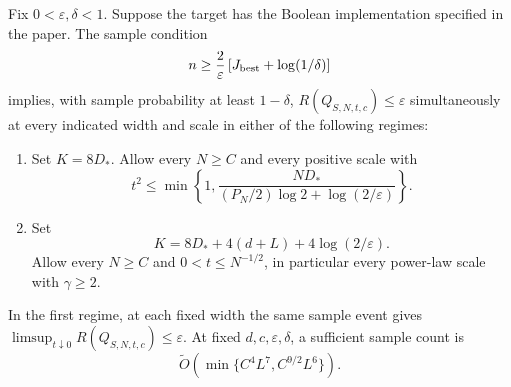 \begin{theorem}
\label{thm:mlmc-posterior}
Fix $0<\varepsilon,\delta<1$. Suppose the target has the Boolean
implementation specified in the paper. The sample condition
\[
 n\ge\frac2\varepsilon
       \left[J_{\rm best}+\log(1/\delta)\right]
\]
implies, with sample probability at least $1-\delta$,
$R(Q_{S,N,t,c})\le\varepsilon$ simultaneously at every indicated width
and scale in either of the following regimes:
\begin{enumerate}
\item Set $K=8D_*$. Allow every $N\ge C$ and every positive scale with
\[
 t^2\le\min\left\{1,
 \frac{ND_*}{(P_N/2)\log2+\log(2/\varepsilon)}\right\}.
\]
\item Set
\[
 K=8D_*+4(d+L)+4\log(2/\varepsilon).
\]
Allow every $N\ge C$ and $0<t\le N^{-1/2}$, in particular every
power-law scale with $\gamma\ge2$.
\end{enumerate}
In the first regime, at each fixed width the same sample event gives
$\limsup_{t\downarrow0}R(Q_{S,N,t,c})\le\varepsilon$.
At fixed $d,c,\varepsilon,\delta$, a sufficient sample count is
\[
 \widetilde O\!\left(
      \min\{C^4L^7,C^{9/2}L^6\}\right).
\]
\end{theorem}


